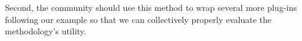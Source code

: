 \documentclass[conference]{IEEEtran}
\begin{document}
Second, the community should use this method to wrap several more
plug-ins following our example so that we can collectively properly
evaluate the methodology's utility.






%
%
%
%





\end{document}
